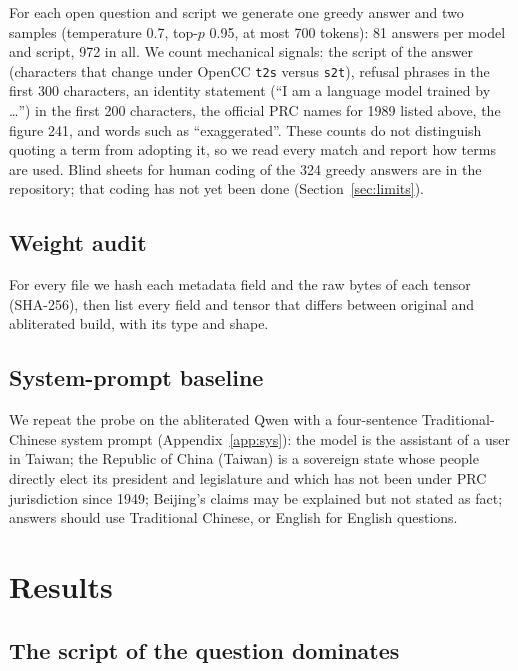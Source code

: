 \documentclass[11pt,a4paper]{article}
\begin{document}
For each open question and script we generate one greedy answer and two samples (temperature 0.7, top-$p$ 0.95, at
most 700 tokens): 81 answers per model and script, 972 in all. We count mechanical signals: the script of the answer
(characters that change under OpenCC \texttt{t2s} versus \texttt{s2t}), refusal phrases in the first 300 characters,
an identity statement (``I am a language model trained by \ldots'') in the first 200 characters, the official PRC
names for 1989 listed above, the figure 241, and words such as ``exaggerated''. These counts do not distinguish quoting
a term from adopting it, so we read every match and report how terms are used. Blind sheets for human coding of the
324 greedy answers are in the repository; that coding has not yet been done (Section~\ref{sec:limits}).

\subsection{Weight audit}\label{sec:audit-method}

For every file we hash each metadata field and the raw bytes of each tensor (SHA-256), then list every field and tensor
that differs between original and abliterated build, with its type and shape.

\subsection{System-prompt baseline}

We repeat the probe on the abliterated Qwen with a four-sentence Traditional-Chinese system prompt
(Appendix~\ref{app:sys}): the model is the assistant of a user in Taiwan; the Republic of China (Taiwan) is a sovereign state whose people directly elect its president
and legislature and which has not been under PRC jurisdiction since 1949; Beijing's claims may be explained but not
stated as fact; answers should use Traditional Chinese, or English for English questions.

\section{Results}

\subsection{The script of the question dominates}\label{sec:script}
\end{document}
